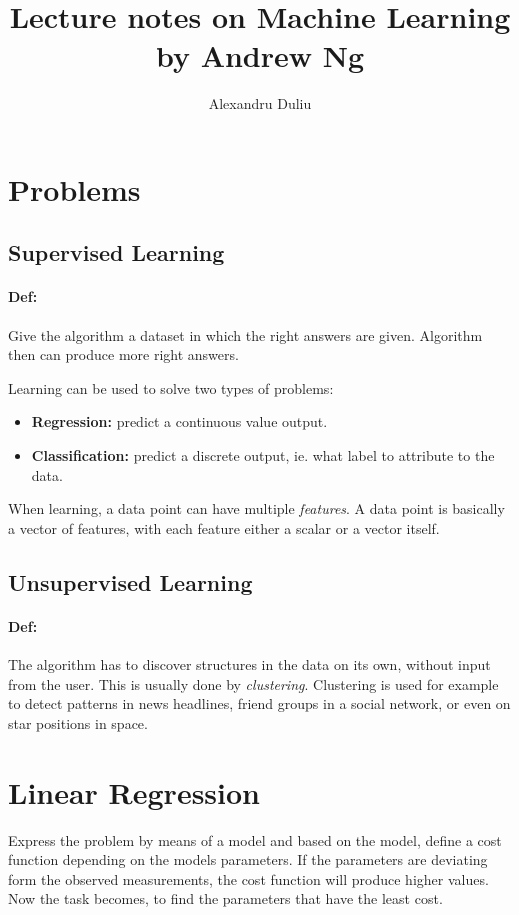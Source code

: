 \documentclass[11pt,a4paper]{article}
\title{Lecture notes on Machine Learning by Andrew Ng}
\author{Alexandru Duliu}
\date{}
\begin{document}
\maketitle

\section{Problems}
\subsection{Supervised Learning}
\paragraph*{Def:} Give the algorithm a dataset in which the right answers are given. 
Algorithm then can produce more right answers. 

Learning can be used to solve two types of problems:
\begin{itemize}
\item \textbf{Regression:} predict a continuous value output.
\item \textbf{Classification:} predict a discrete output, ie. what label to attribute to the data.
\end{itemize}

When learning, a data point can have multiple \emph{features}. 
A data point is basically a vector of features, with each feature either a scalar or a vector itself.

\subsection{Unsupervised Learning}
\paragraph*{Def:} The algorithm has to discover structures in the data on its own, without input from the user.
This is usually done by \emph{clustering}. 
Clustering is used for example to detect patterns in news headlines, friend groups in a social network, or even on star positions in space.

\section{Linear Regression}
Express the problem by means of a model and based on the model, define a cost function depending on the models parameters. 
If the parameters are deviating form the observed measurements, the cost function will produce higher values. 
Now the task becomes, to find the parameters that have the least cost.
\end{document}
